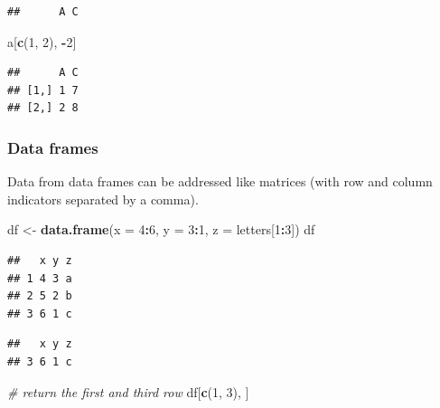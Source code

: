 \documentclass[
]{book}
\newenvironment{Shaded}{\begin{snugshade}}{\end{snugshade}}
\newcommand{\AttributeTok}[1]{\textcolor[rgb]{0.13,0.29,0.53}{#1}}
\newcommand{\CommentTok}[1]{\textcolor[rgb]{0.56,0.35,0.01}{\textit{#1}}}
\newcommand{\DecValTok}[1]{\textcolor[rgb]{0.00,0.00,0.81}{#1}}
\newcommand{\FunctionTok}[1]{\textcolor[rgb]{0.13,0.29,0.53}{\textbf{#1}}}
\newcommand{\NormalTok}[1]{#1}
\newcommand{\OtherTok}[1]{\textcolor[rgb]{0.56,0.35,0.01}{#1}}
\newcommand{\SpecialCharTok}[1]{\textcolor[rgb]{0.81,0.36,0.00}{\textbf{#1}}}
\begin{document}
\begin{verbatim}
##      A C
\end{verbatim}

\begin{Shaded}
\begin{Highlighting}[]
\NormalTok{a[}\FunctionTok{c}\NormalTok{(}\DecValTok{1}\NormalTok{, }\DecValTok{2}\NormalTok{), }\SpecialCharTok{{-}}\DecValTok{2}\NormalTok{]}
\end{Highlighting}
\end{Shaded}

\begin{verbatim}
##      A C
## [1,] 1 7
## [2,] 2 8
\end{verbatim}

\subsubsection{Data frames}\label{data-frames}

Data from data frames can be addressed like matrices (with row and column indicators separated by a comma).

\begin{Shaded}
\begin{Highlighting}[]
\NormalTok{df }\OtherTok{\textless{}{-}} \FunctionTok{data.frame}\NormalTok{(}\AttributeTok{x =} \DecValTok{4}\SpecialCharTok{:}\DecValTok{6}\NormalTok{, }\AttributeTok{y =} \DecValTok{3}\SpecialCharTok{:}\DecValTok{1}\NormalTok{, }\AttributeTok{z =}\NormalTok{ letters[}\DecValTok{1}\SpecialCharTok{:}\DecValTok{3}\NormalTok{])}
\NormalTok{df}
\end{Highlighting}
\end{Shaded}

\begin{verbatim}
##   x y z
## 1 4 3 a
## 2 5 2 b
## 3 6 1 c
\end{verbatim}

\begin{Shaded}
\end{Shaded}

\begin{verbatim}
##   x y z
## 3 6 1 c
\end{verbatim}

\begin{Shaded}
\begin{Highlighting}[]
\CommentTok{\# return the first and third row}
\NormalTok{df[}\FunctionTok{c}\NormalTok{(}\DecValTok{1}\NormalTok{, }\DecValTok{3}\NormalTok{), ]}
\end{Highlighting}
\end{Shaded}
\end{document}
